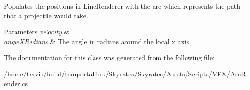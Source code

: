 Populates the positions in Line\-Renderer with the arc which represents the path that a projectile would take. 


\begin{DoxyParams}{Parameters}
{\em velocity} & \\
\hline
{\em angle\-X\-Radians} & The angle in radians around the local x axis\\
\hline
\end{DoxyParams}


The documentation for this class was generated from the following file\-:\begin{DoxyCompactItemize}
\item 
/home/travis/build/temportalflux/\-Skyrates/\-Skyrates/\-Assets/\-Scripts/\-V\-F\-X/Arc\-Render.\-cs\end{DoxyCompactItemize}
